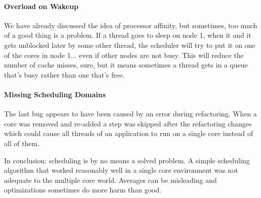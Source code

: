\paragraph{Overload on Wakeup} We have already discussed the idea of processor affinity, but sometimes, too much of a good thing is a problem. If a thread goes to sleep on node 1, when it and it gets unblocked later by some other thread, the scheduler will try to put it on one of the cores in node 1... even if other nodes are not busy. This will reduce the number of cache misses, sure, but it means sometimes a thread gets in a queue that's busy rather than one that's free.

\paragraph{Missing Scheduling Domains}
The last bug appears to have been caused by an error during refactoring. When a core was removed and re-added a step was skipped after the refactoring changes which could cause all threads of an application to run on a single core instead of all of them. 

In conclusion: scheduling is by no means a solved problem. A simple scheduling algorithm that worked reasonably well in a single core environment was not adequate to the multiple core world. Averages can be misleading and optimizations sometimes do more harm than good. 



